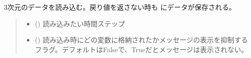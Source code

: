 \documentclass[letterpaper,10pt,dvipdfmx,report]{sphinxmanual}
\begin{document}
\begin{fulllineitems}
\label{\detokenize{io:R2D2.R2D2_data.read_qq}}
\pysigstartsignatures
{}
\pysigstopsignatures
\sphinxAtStartPar
3次元のデータを読み込む。戻り値を返さない時も {\hyperref[\detokenize{io:R2D2.R2D2_data.qq}]{}} にデータが保存される。
\begin{quote}\begin{description}
\begin{itemize}
\item {} 
\sphinxAtStartPar
{} () \sphinxhyphen{}\sphinxhyphen{} 読み込みたい時間ステップ

\item {} 
\sphinxAtStartPar
{} () \sphinxhyphen{}\sphinxhyphen{} 読み込み時にどの変数に格納されたかメッセージの表示を抑制するフラグ。デフォルトはFalseで、Trueだとメッセージは表示されない。

\end{itemize}

\end{description}\end{quote}

\end{fulllineitems}

\end{document}
